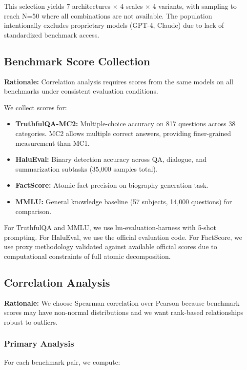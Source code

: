 This selection yields 7 architectures $\times$ 4 scales $\times$ 4 variants, with sampling to reach N=50 where all combinations are not available. The population intentionally excludes proprietary models (GPT-4, Claude) due to lack of standardized benchmark access.

\subsection{Benchmark Score Collection}

\textbf{Rationale:} Correlation analysis requires scores from the same models on all benchmarks under consistent evaluation conditions.

We collect scores for:

\begin{itemize}
\item \textbf{TruthfulQA-MC2:} Multiple-choice accuracy on 817 questions across 38 categories. MC2 allows multiple correct answers, providing finer-grained measurement than MC1.
\item \textbf{HaluEval:} Binary detection accuracy across QA, dialogue, and summarization subtasks (35,000 samples total).
\item \textbf{FactScore:} Atomic fact precision on biography generation task.
\item \textbf{MMLU:} General knowledge baseline (57 subjects, 14,000 questions) for comparison.
\end{itemize}

For TruthfulQA and MMLU, we use lm-evaluation-harness with 5-shot prompting. For HaluEval, we use the official evaluation code. For FactScore, we use proxy methodology validated against available official scores due to computational constraints of full atomic decomposition.

\subsection{Correlation Analysis}

\textbf{Rationale:} We choose Spearman correlation over Pearson because benchmark scores may have non-normal distributions and we want rank-based relationships robust to outliers.

\subsubsection{Primary Analysis}

For each benchmark pair, we compute:


